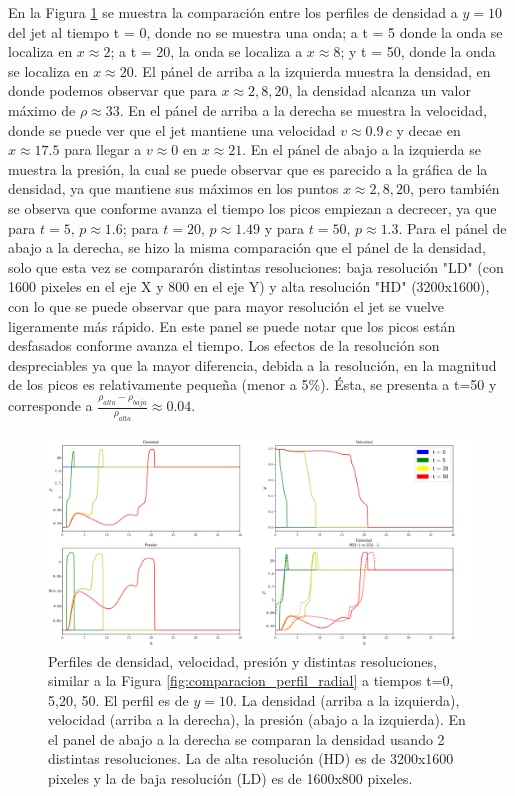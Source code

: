 \documentclass[12pt,a4paper]{book}
\begin{document}
En la Figura \ref{fig:Decaimiento_constante_densidad_jet} se muestra la comparación entre los perfiles de 
densidad a $y = 10$
del jet al tiempo t = 0, donde no se muestra una onda; a t = 5 donde la onda se localiza en $x \approx 2$; 
a t = 20, la onda se localiza a $x \approx 8$; y  t = 50, donde la onda se localiza en $x \approx 20$. 
El pánel de arriba a la izquierda muestra la densidad, en donde
podemos observar que para $x \approx 2, 8, 20$,  la densidad alcanza un valor máximo de 
$\rho  \approx 33$.
En el pánel de arriba a la derecha se muestra la velocidad, donde se puede ver que el jet mantiene una velocidad 
$v \approx 0.9 \, c$ y decae en $x \approx 17.5$ para llegar a $v \approx 0 $ en  $x \approx 21$. 
En el pánel de abajo a la
izquierda se muestra la presión, la cual se puede observar que es parecido a la gráfica de la 
densidad, ya que mantiene sus máximos en los puntos $x \approx 2, 8, 20$, pero también se observa que conforme avanza el
tiempo los picos empiezan a decrecer, ya que para $t = 5, \, p \approx 1.6 $; 
para $t = 20, \, p \approx 1.49$ y para 
$t = 50, \, p  \approx 1.3$. Para el pánel de abajo a la derecha, se hizo la misma comparación que el pánel 
de la densidad, solo que esta vez se compararón  distintas resoluciones: baja resolución "LD" (con 1600 pixeles en el eje X y 800 en el eje Y) 
y alta resolución "HD" (3200x1600), con lo que se puede observar que 
para mayor resolución el jet se vuelve ligeramente más rápido. En este panel se puede notar que
los picos están desfasados conforme avanza el tiempo. Los efectos de la resolución son despreciables ya 
que la mayor diferencia, debida a la resolución, en la magnitud de los picos es relativamente pequeña (menor a 5\%). Ésta, se presenta a t=50 y corresponde 
a $\frac{\rho_{alta} - \rho_{baja}}{\rho_{alta}} \approx 0.04$.


\begin{figure}
  \centering
  \includegraphics[width = 1.0\textwidth]{./Figuras/jet/perfiles/perfiles_constantes.png}
  \caption{Perfiles de densidad, velocidad, presión y distintas resoluciones, similar a la Figura 
  \ref{fig:comparacion_perfil_radial} a tiempos t=0, 5,20, 50.
  El perfil es de $y = 10$.
  La densidad (arriba a la izquierda), velocidad (arriba a la derecha), la presión (abajo a la izquierda). 
  En el panel de abajo a la derecha se comparan la densidad usando 2 distintas resoluciones. La de alta resolución 
  (HD)
  es de 3200x1600 pixeles y la de baja resolución (LD) es de 1600x800 pixeles.}\label{fig:Decaimiento_constante_densidad_jet}
\end{figure}
\end{document}
